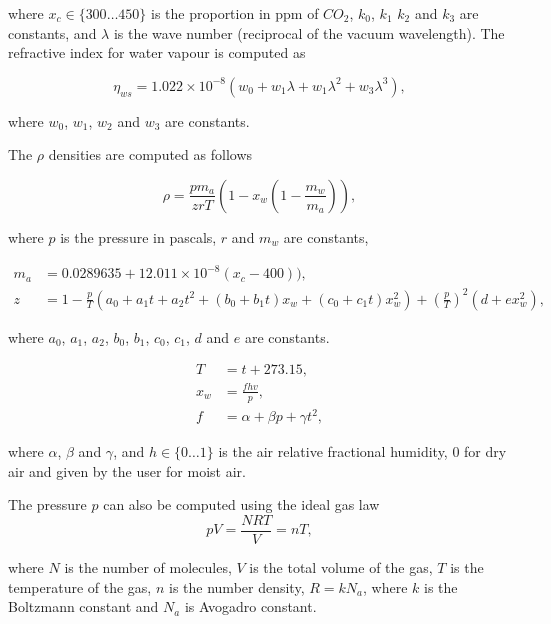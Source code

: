 where $x_c \in \lbrace 300 \ldots 450 \rbrace $ is the proportion in ppm of $CO_2$, $k_0$, $k_1$ $k_2$ and $k_3$ are constants, and $\lambda$ is the wave number (reciprocal of the vacuum wavelength).
The refractive index for water vapour is computed as

\begin{equation}
\label{eq:ciddor_eta_ws}
\eta_{ws} = 1.022 \times 10^{-8} \left( w_0 + w_1 \lambda + w_1 \lambda^2 + w_3 \lambda^3 \right),
\end{equation}

where $w_0$, $w_1$, $w_2$ and $w_3$ are constants.

The $\rho$ densities are computed as follows

\begin{equation}
\label{eq:ciddor_rho}
\rho =  \frac{p m_a}{zrT} \left( 1 - x_w \left(1 - \frac{m_w}{m_a} \right) \right), 
\end{equation}

where $p$ is the pressure in pascals, $r$ and $m_w$ are constants, 

\begin{align}
\label{eq:ciddor_m_a}
m_a &= 0.0289635 + 12.011 \times 10^{-8}(x_c - 400)),\\
\label{eq:ciddor_z}
z &= 1 - \frac{p}{T} \left(a_0 + a_1 t + a_2 t^2 + \left(b_0 + b_1 t \right) x_w + \left(c_0 + c_1 t \right) x_w^2 \right) + \left( \frac{p}{T} \right)^2 \left( d + ex_w^2 \right),
\end{align}

where $a_0$,  $a_1$, $a_2$,  $b_0$,  $b_1$,  $c_0$,  $c_1$,  $d$ and $e$ are constants.

\begin{align}
\label{eq:ciddor_t}
T &= t + 273.15, \\
\label{eq:ciddor_x_w}
x_w &= \frac{f h v}{ p}, \\
\label{eq:ciddor_f}
f &= \alpha + \beta p + \gamma t^2,
\end{align}

where $\alpha$, $\beta$ and $\gamma$, and $h \in \lbrace 0 \ldots 1 \rbrace$ is the air relative fractional humidity, $0$ for dry air and given by the user for moist air.

The pressure $p$ can also be computed using the ideal gas law
\begin{equation}
\label{eq:ciddor_p}
pV=\frac{NRT}{V} = n T,
\end{equation}

where $N$ is the number of molecules, $V$ is the total volume of the gas, $T$ is the temperature of the gas, $n$ is the number density, $R = k N_a$, where $k$ is the Boltzmann constant and $N_a$ is Avogadro constant.

